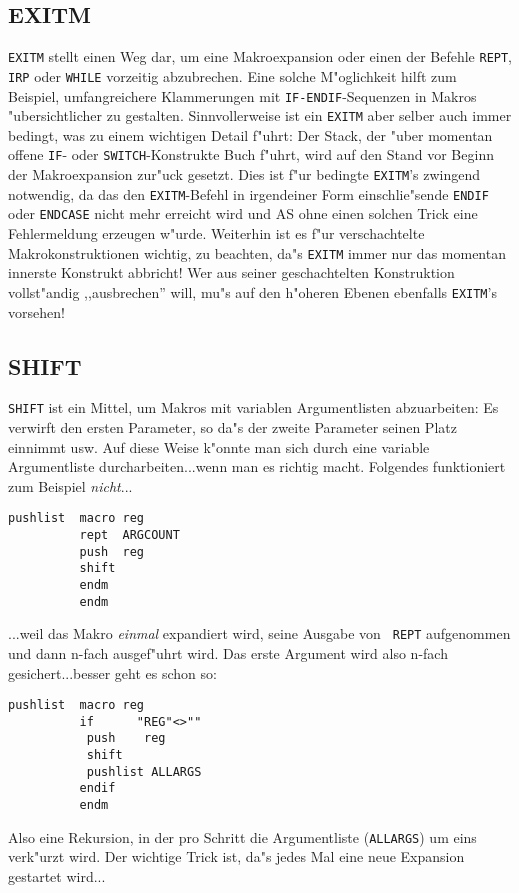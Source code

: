 \documentclass[12pt,a4paper,twoside]{report}
\makeatletter
\newcommand{\tty}[1]{{\tt #1}}
\newcommand{\ttindex}[1]{\index{#1@{\tt #1}}}
\makeatother
\begin{document}

\subsection{EXITM}
\ttindex{EXITM}

\tty{EXITM} stellt einen Weg dar, um eine Makroexpansion oder einen der
Befehle \tty{REPT}, \tty{IRP} oder \tty{WHILE} vorzeitig abzubrechen.
Eine solche M"oglichkeit hilft zum Beispiel, umfangreichere Klammerungen
mit \tty{IF-ENDIF}-Sequenzen in Makros "ubersichtlicher zu gestalten.
Sinnvollerweise ist ein \tty{EXITM} aber selber auch immer bedingt, was zu
einem wichtigen Detail f"uhrt: Der Stack, der "uber momentan offene
\tty{IF}- oder \tty{SWITCH}-Konstrukte Buch f"uhrt, wird auf den Stand vor
Beginn der Makroexpansion zur"uck gesetzt.  Dies ist f"ur bedingte
\tty{EXITM}'s zwingend notwendig, da das den \tty{EXITM}-Befehl in
irgendeiner Form einschlie"sende \tty{ENDIF} oder \tty{ENDCASE} nicht mehr
erreicht wird und AS ohne einen solchen Trick eine Fehlermeldung erzeugen
w"urde.  Weiterhin ist es f"ur verschachtelte Makrokonstruktionen
wichtig, zu beachten, da"s \tty{EXITM} immer nur das momentan innerste
Konstrukt abbricht!  Wer aus seiner geschachtelten Konstruktion
vollst"andig ,,ausbrechen'' will, mu"s auf den h"oheren Ebenen ebenfalls
\tty{EXITM}'s vorsehen!


\subsection{SHIFT}
\ttindex{SHIFT}\ttindex{SHFT}

{\tt SHIFT} ist ein Mittel, um Makros mit variablen Argumentlisten
abzuarbeiten: Es verwirft den ersten Parameter, so da"s der zweite
Parameter seinen Platz einnimmt usw.  Auf diese Weise k"onnte man
sich durch eine variable Argumentliste durcharbeiten...wenn man es richtig
macht.  Folgendes funktioniert zum Beispiel {\em nicht}...
\begin{verbatim}
pushlist  macro reg
          rept  ARGCOUNT
          push  reg
          shift
          endm
          endm
\end{verbatim}
...weil das Makro {\em einmal} expandiert wird, seine Ausgabe von {\tt
REPT} aufgenommen und dann n-fach ausgef"uhrt wird.  Das erste Argument
wird also n-fach gesichert...besser geht es schon so:
\begin{verbatim}
pushlist  macro reg
          if      "REG"<>""
           push    reg
           shift
           pushlist ALLARGS
          endif
          endm
\end{verbatim}
Also eine Rekursion, in der pro Schritt die Argumentliste ({\tt ALLARGS})
um eins verk"urzt wird.  Der wichtige Trick ist, da"s jedes Mal eine neue
Expansion gestartet wird...
\end{document}
